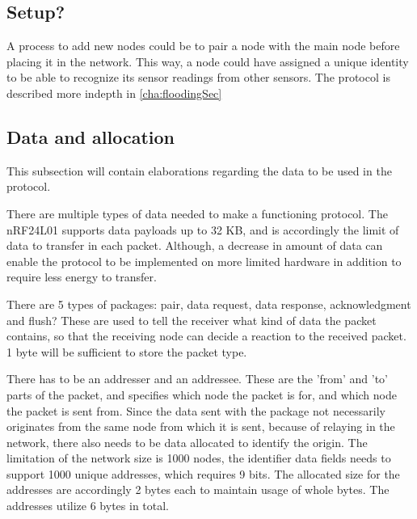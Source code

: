 \subsection{Setup?}
A process to add new nodes could be to pair a node with the main node before placing it in the network. This way, a node could have assigned a unique identity to be able to recognize its sensor readings from other sensors. 
The protocol is described more indepth in \ref{cha:floodingSec}




\subsection{Data and allocation}
This subsection will contain elaborations regarding the data to be used in the protocol.

There are multiple types of data needed to make a functioning protocol. The nRF24L01 supports data payloads up to 32 KB, and is accordingly the limit of data to transfer in each packet. Although, a decrease in amount of data can enable the protocol to be implemented on more limited hardware in addition to require less energy to transfer.

There are 5 types of packages: pair, data request, data response, acknowledgment and flush? These are used to tell the receiver what kind of data the packet contains, so that the receiving node can decide a reaction to the received packet. 1 byte will be sufficient to store the packet type.

There has to be an addresser and an addressee. These are the 'from' and 'to' parts of the packet, and specifies which node the packet is for, and which node the packet is sent from. Since the data sent with the package not necessarily originates from the same node from which it is sent, because of relaying in the network, there also needs to be data allocated to identify the origin. The limitation of the network size is 1000 nodes, the identifier data fields needs to support 1000 unique addresses, which requires 9 bits. The allocated size for the addresses are accordingly 2 bytes each to maintain usage of whole bytes. The addresses utilize 6 bytes in total.

